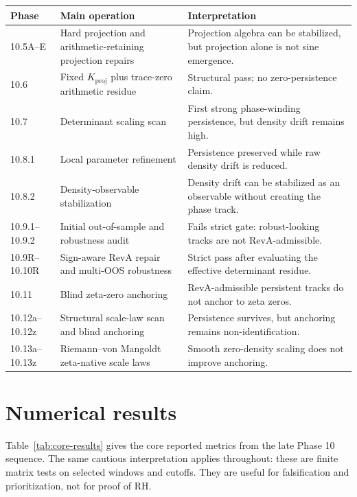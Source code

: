 \documentclass[11pt]{article}
\newcommand{\Kproj}{K_{\mathrm{proj}}}
\theoremstyle{definition}
\theoremstyle{plain}
\begin{document}
\begin{longtable}{p{}p{}p{}}
\toprule
Phase & Main operation & Interpretation \\
\midrule
10.5A--E & Hard projection and arithmetic-retaining projection repairs & Projection algebra can be stabilized, but projection alone is not sine emergence. \\
10.6 & Fixed $\Kproj$ plus trace-zero arithmetic residue & Structural pass; no zero-persistence claim. \\
10.7 & Determinant scaling scan & First strong phase-winding persistence, but density drift remains high. \\
10.8.1 & Local parameter refinement & Persistence preserved while raw density drift is reduced. \\
10.8.2 & Density-observable stabilization & Density drift can be stabilized as an observable without creating the phase track. \\
10.9.1--10.9.2 & Initial out-of-sample and robustness audit & Fails strict gate: robust-looking tracks are not RevA-admissible. \\
10.9R--10.10R & Sign-aware RevA repair and multi-OOS robustness & Strict pass after evaluating the effective determinant residue. \\
10.11 & Blind zeta-zero anchoring & RevA-admissible persistent tracks do not anchor to zeta zeros. \\
10.12a--10.12z & Structural scale-law scan and blind anchoring & Persistence survives, but anchoring remains non-identification. \\
10.13a--10.13z & Riemann--von Mangoldt zeta-native scale laws & Smooth zero-density scaling does not improve anchoring. \\
\bottomrule
\end{longtable}

\section{Numerical results}

Table~\ref{tab:core-results} gives the core reported metrics from the late Phase 10 sequence.  The same cautious interpretation applies throughout: these are finite matrix tests on selected windows and cutoffs.  They are useful for falsification and prioritization, not for proof of RH.
\end{document}
